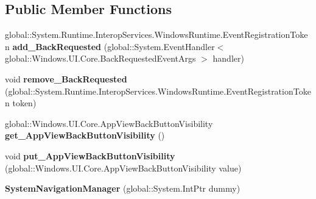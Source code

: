 \subsection*{Public Member Functions}
\begin{DoxyCompactItemize}
\item 
\mbox{\label{class_windows_1_1_u_i_1_1_core_1_1_system_navigation_manager_a505f794c14a0da8cd15a31aa6273a6d7}} 
global\+::\+System.\+Runtime.\+Interop\+Services.\+Windows\+Runtime.\+Event\+Registration\+Token {\bfseries add\+\_\+\+Back\+Requested} (global\+::\+System.\+Event\+Handler$<$ global\+::\+Windows.\+U\+I.\+Core.\+Back\+Requested\+Event\+Args $>$ handler)
\item 
\mbox{\label{class_windows_1_1_u_i_1_1_core_1_1_system_navigation_manager_abf606a807ad7581e8b10c99338d9221a}} 
void {\bfseries remove\+\_\+\+Back\+Requested} (global\+::\+System.\+Runtime.\+Interop\+Services.\+Windows\+Runtime.\+Event\+Registration\+Token token)
\item 
\mbox{\label{class_windows_1_1_u_i_1_1_core_1_1_system_navigation_manager_a3aa076218316c5f742b0c8611394df04}} 
global\+::\+Windows.\+U\+I.\+Core.\+App\+View\+Back\+Button\+Visibility {\bfseries get\+\_\+\+App\+View\+Back\+Button\+Visibility} ()
\item 
\mbox{\label{class_windows_1_1_u_i_1_1_core_1_1_system_navigation_manager_afe04efb626cf6de6a695ea8debc94023}} 
void {\bfseries put\+\_\+\+App\+View\+Back\+Button\+Visibility} (global\+::\+Windows.\+U\+I.\+Core.\+App\+View\+Back\+Button\+Visibility value)
\item 
\mbox{\label{class_windows_1_1_u_i_1_1_core_1_1_system_navigation_manager_ae4d0015a9d24d73ac2ebcf8019f386b2}} 
{\bfseries System\+Navigation\+Manager} (global\+::\+System.\+Int\+Ptr dummy)
\item 
\mbox{\label{class_windows_1_1_u_i_1_1_core_1_1_system_navigation_manager_a505f794c14a0da8cd15a31aa6273a6d7}} 

\end{DoxyCompactItemize}

